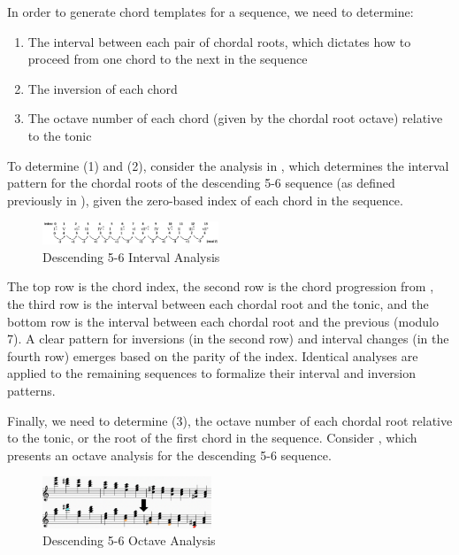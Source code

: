 \documentclass{article}
\begin{document}
In order to generate chord templates for a sequence, we need to determine:

\begin{enumerate}
\itemsep0pt 
\item The interval between each pair of chordal roots, which dictates how to proceed from one chord to the next in the sequence
\item The inversion of each chord
\item The octave number of each chord (given by the chordal root octave) relative to the tonic
\end{enumerate}


To determine (1) and (2), consider the analysis in , which determines the interval pattern for the chordal roots of the descending 5-6 sequence (as defined previously in ), given the zero-based index of each chord in the sequence.


\begin{figure}[!htbp]
\centering
\includegraphics[width=0.47\textwidth]{images/desc_56_intervals}
  \caption{Descending 5-6 Interval Analysis}\label{fig:desc_56_intervals}
\end{figure}


The top row is the chord index, the second row is the chord progression from , the third row is the interval between each chordal root and the tonic, and the bottom row is the interval between each chordal root and the previous (modulo 7). A clear pattern for inversions (in the second row) and interval changes (in the fourth row) emerges based on the parity of the index. Identical analyses are applied to the remaining sequences to formalize their interval and inversion patterns.

Finally, we need to determine (3), the octave number of each chordal root relative to the tonic, or the root of the first chord in the sequence. Consider , which presents an octave analysis for the descending 5-6 sequence.

\begin{figure}[!htbp]
\centering
\includegraphics[width=0.45\textwidth]{images/desc56-example}
  \caption{Descending 5-6 Octave Analysis}
  \label{fig:desc56-example}
\end{figure}
\end{document}
